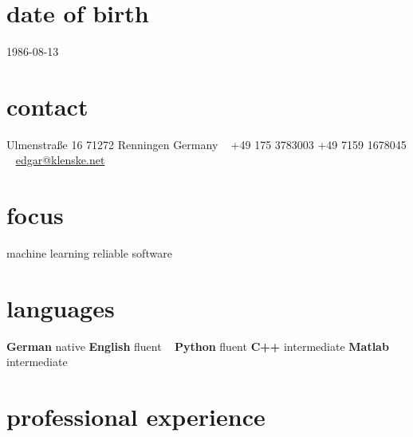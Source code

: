 \documentclass[a4paper]{k-cv} %
\begin{document}


\begin{aside} %
  \section{date of birth}
  \color{gray}1986-08-13
  \section{contact}
  \color{headercolor}Ulmenstraße 16
  71272 Renningen
  Germany
  ~
  +49 175 3783003
  +49 7159 1678045
  ~
  \href{mailto:edgar@klenske.net}{edgar@klenske.net}
  \section{focus}
  machine learning
  reliable software
  \section{languages}
   {\bfseries German} native
    {\bfseries English} fluent
  ~
  {\bfseries Python} fluent
    {\bfseries C++} intermediate
    {\bfseries Matlab} intermediate
\end{aside}


\section{professional experience}
\end{document}
